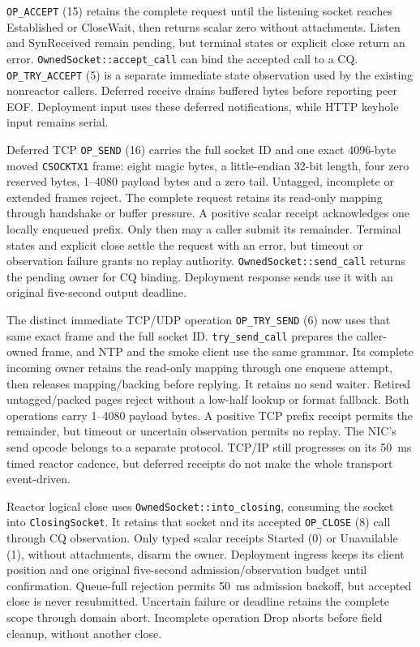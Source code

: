 \texttt{OP\_ACCEPT} (15) retains the complete request until the listening
socket reaches Established or CloseWait, then returns scalar zero without
attachments. Listen and SynReceived remain pending, but terminal states or explicit
close return an error. \texttt{OwnedSocket::accept\_call} can bind the accepted
call to a CQ. \texttt{OP\_TRY\_ACCEPT} (5) is a separate immediate state
observation used by the existing nonreactor callers. Deferred receive drains
buffered bytes before reporting peer EOF. Deployment input uses these deferred
notifications, while HTTP keyhole input remains serial.

Deferred TCP \texttt{OP\_SEND} (16) carries the full socket ID and one exact
4096-byte moved \texttt{CSOCKTX1} frame: eight magic bytes, a little-endian
32-bit length, four zero reserved bytes, 1--4080 payload bytes and a zero tail.
Untagged, incomplete or extended frames reject. The complete request retains
its read-only mapping through handshake or buffer pressure. A positive scalar
receipt acknowledges one locally enqueued prefix. Only then may a caller submit
its remainder. Terminal states and explicit close settle the request with an
error, but timeout or observation failure grants no replay authority.
\texttt{OwnedSocket::send\_call} returns the pending owner for CQ binding.
Deployment response sends use it with an original five-second output deadline.

The distinct immediate TCP/UDP operation \texttt{OP\_TRY\_SEND} (6) now uses
that same exact frame and the full socket ID. \texttt{try\_send\_call} prepares
the caller-owned frame, and NTP and the smoke client use the same grammar. Its
complete incoming owner retains the read-only mapping through one enqueue
attempt, then releases mapping/backing before replying. It retains no send
waiter. Retired untagged/packed pages reject without a low-half lookup or format
fallback. Both operations carry 1--4080 payload bytes. A positive TCP prefix
receipt permits the remainder, but timeout or uncertain observation permits no
replay. The NIC's send opcode belongs to a separate protocol. TCP/IP still
progresses on its 50~ms timed reactor cadence, but deferred
receipts do not make the whole transport event-driven.

Reactor logical close uses \texttt{OwnedSocket::into\_closing}, consuming the
socket into \texttt{ClosingSocket}. It retains that socket and its accepted
\texttt{OP\_CLOSE} (8) call through CQ observation. Only typed scalar receipts
Started (0) or Unavailable (1), without attachments, disarm the owner. Deployment ingress keeps its client position
and one original five-second admission/observation budget until confirmation.
Queue-full rejection permits 50~ms admission backoff, but accepted close is never
resubmitted. Uncertain failure or deadline retains the complete scope through
domain abort. Incomplete operation Drop aborts before field cleanup, without
another close.

